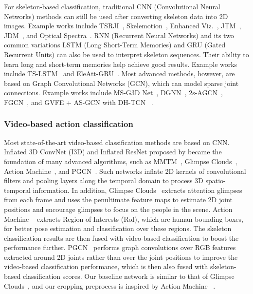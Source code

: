 \documentclass{article}
\begin{document}
{For skeleton-based classification, traditional CNN (Convolutional Neural Networks) methods can still be used after converting skeleton data into 2D images. Example works include TSRJI~\cite{caetano2019skeleton}, Skelemotion~\cite{Caetano_2019}, Enhanced Viz.~\cite{articleLiu}, JTM~\cite{Wang_2016}, JDM~\cite{Li2017Joint}, and Optical Spectra~\cite{Hou2018Skeleton}. RNN (Recurrent Neural Networks) and its two common variations LSTM (Long Short-Term Memories) and GRU (Gated Recurrent Units) can also be used to interpret skeleton sequences. Their ability to learn long and short-term memories help achieve good results. Example works include TS-LSTM~\cite{Lee2017enesmble} and EleAtt-GRU~\cite{zhang2018adding}. Most advanced methods, however, are based on Graph Convolutional Networks (GCN), which can model sparse joint connections. Example works include MS-G3D Net~\cite{liu2020disentangling}, DGNN~\cite{Shi_2019_Skeleton}, 2s-AGCN~\cite{shi2018twostream}, FGCN~\cite{yang2020feedback}, and GVFE + AS-GCN with DH-TCN ~\cite{papadopoulos2019vertex}. } 

\subsubsection{Video-based action classification}
{Most state-of-the-art video-based classification methods are based on CNN. Inflated 3D ConvNet (I3D) and Inflated ResNet proposed by \cite{carreira2017quo} became the foundation of many advanced algorithms, such as MMTM~\cite{joze2019mmtm}, Glimpse Clouds~\cite{Baradel_2018}, Action Machine~\cite{zhu2018action}, and PGCN~\cite{shi2019action}. Such networks inflate 2D kernels of convolutional filters and pooling layers along the temporal domain to process 3D spatio-temporal information. In addition, Glimpse Clouds~\cite{Baradel_2018} extracts attention glimpses from each frame and uses the penultimate feature maps to estimate 2D joint positions and encourage glimpses to focus on the people in the scene. Action Machine ~\cite{zhu2018action} extracts Region of Interests (RoI), which are human bounding boxes, for better pose estimation and classification over these regions. The skeleton classification results are then fused with video-based classification to boost the performance further. PGCN~\cite{shi2019action} performs graph convolutions over RGB features extracted around 2D joints rather than over the joint positions to improve the video-based classification performance, which is then also fused with skeleton-based classification scores. Our baseline network is similar to that of Glimpse Clouds~\cite{Baradel_2018}, and our cropping preprocess is inspired by Action Machine ~\cite{zhu2018action}.}
\end{document}
